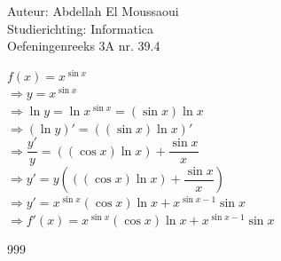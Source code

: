 \documentclass[a4paper]{article}
\begin{document}
  
\noindent \large Auteur: Abdellah El Moussaoui \\
\noindent \large Studierichting: Informatica\\
\noindent \large Oefeningenreeks 3A nr. 39.4\\

\medskip

\normalsize

$f(x)=x^{\sin x}$\\

$\Rightarrow y=x^{\sin x}$\\

$\Rightarrow  \ln y=\ln x^{\sin x} = \left(\sin x\right) \ln x$\\

$\Rightarrow \left(\ln y\right)'= \left(\left(\sin x\right) \ln x \right)'$\\

$\Rightarrow \dfrac{y'}{y} = \left(\left(\cos x\right) \ln x\right) + \dfrac{\sin x}{x}$\\

$\Rightarrow y' = y \left(\left(\left(\cos x\right) \ln x\right) + \dfrac{\sin x}{x}\right)$\\

$\Rightarrow y' =  x^{\sin x}\left(\cos x\right) \ln x + x^{\sin x-1}\sin x$\\


$\Rightarrow \boxed{f'(x) = x^{\sin x}\left(\cos x\right) \ln x + x^{\sin x-1}\sin x}$\\



\begin{thebibliography}{999}
\end{thebibliography}
\end{document}
